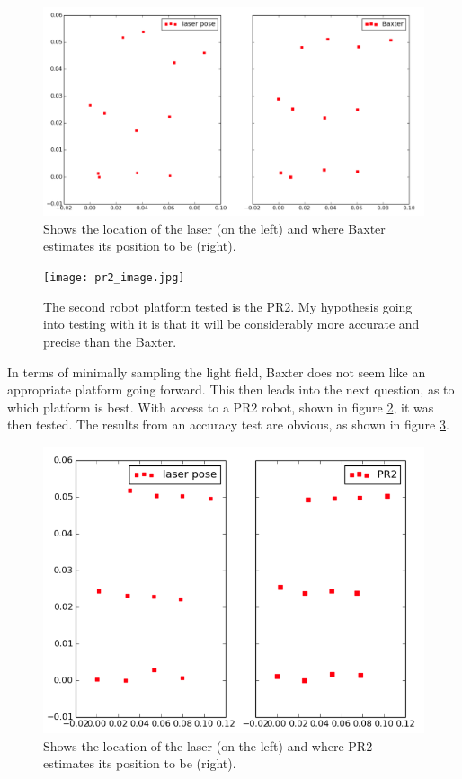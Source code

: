 \documentclass[12pt]{report}
\begin{document}
\begin{figure}[!ht]
	\centering
	\includegraphics[scale=0.35]{baxter_and_laser.png}
	\caption{Shows the location of the laser (on the left) and where Baxter estimates its position to be (right).}
	\label{fig:bax_and_lase}
\end{figure}

\begin{figure}[!ht]
	\centering
	\texttt{[image: pr2\_image.jpg]}
	\caption{The second robot platform tested is the PR2. My hypothesis going into testing with it is that it will be considerably more accurate and precise than the Baxter.}
	\label{fig:pr2_image}
\end{figure}

In terms of minimally sampling the light field, Baxter does not seem like an appropriate platform going forward. This then leads into the next question, as to which platform is best. With access to a PR2 robot, shown in figure \ref{fig:pr2_image}, it was then tested. The results from an accuracy test are obvious, as shown in figure \ref{fig:PR2_and_lase}. 

\begin{figure}[!ht]
	\centering
	\includegraphics[scale=0.45]{pr2_and_laser.png}
	\caption{Shows the location of the laser (on the left) and where PR2 estimates its position to be (right).}
	\label{fig:PR2_and_lase}
\end{figure}
\end{document}
